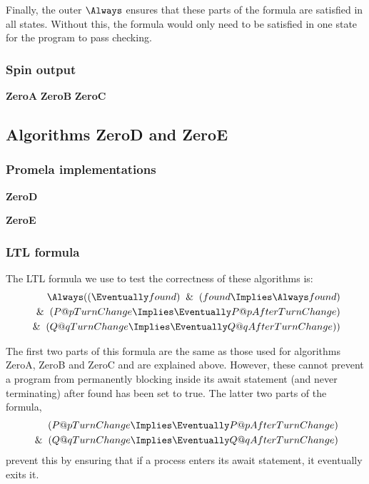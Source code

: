 \documentclass[12pt,a4paper]{scrartcl}
\begin{document}
Finally, the outer \(\Always\) ensures that these parts of the formula are satisfied in all states. Without this, the formula would only need to be satisfied in one state for the program to pass checking.

\subsubsection{Spin output}
\textbf{ZeroA}
\textbf{ZeroB}
\textbf{ZeroC}

\subsection{Algorithms ZeroD and ZeroE}

\subsubsection{Promela implementations}

\textbf{ZeroD}


\textbf{ZeroE}


\subsubsection{LTL formula}

The LTL formula we use to test the correctness of these algorithms is:
\begin{align} 
\Always ( ( \Eventually found ) \And ( found \Implies \Always found )\notag\\
\And ( P@pTurnChange \Implies \Eventually P@pAfterTurnChange )\\
\And ( Q@qTurnChange \Implies \Eventually Q@qAfterTurnChange ) )\notag
\end{align}

The first two parts of this formula are the same as those used for algorithms ZeroA, ZeroB and ZeroC and are explained above. However, these cannot prevent a program from permanently blocking inside its await statement (and never terminating) after found has been set to true. The latter two parts of the formula,
\begin{align} 
( P@pTurnChange \Implies \Eventually P@pAfterTurnChange )\notag\\
\And ( Q@qTurnChange \Implies \Eventually Q@qAfterTurnChange ) 
\end{align}
prevent this by ensuring that if a process enters its await statement, it eventually exits it.
\end{document}
